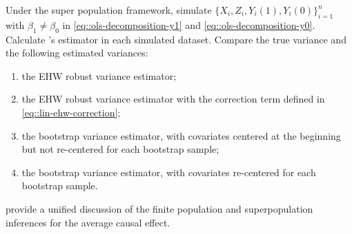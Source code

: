 \begin{HomeworkProblem}\label{exr:9-2}

Under the super population framework, simulate $\{  X_i, Z_i, Y_i(1), Y_i(0) \}_{i=1}^n$ with $\beta_1 \neq \beta_0$ in \eqref{eq::ols-decomposition-y1} and \eqref{eq::ols-decomposition-y0}. Calculate \citet{lin2013}'s estimator in each simulated dataset.
Compare the true variance and the following estimated variances:
\begin{enumerate}
\item
the EHW robust variance estimator;
\item
the EHW robust variance estimator with the correction term defined in \eqref{eq::lin-ehw-correction};
\item
the bootstrap variance estimator, with covariates centered at the beginning but not re-centered for each bootstrap sample;
\item
the bootstrap variance estimator, with covariates re-centered for each bootstrap sample.
\end{enumerate}





\end{HomeworkProblem}

\begin{HomeworkProblem}\label{exr:9-3}


\citet{ding2017bridging} provide a unified discussion of the finite population and superpopulation inferences for the average causal effect.


\end{HomeworkProblem}
